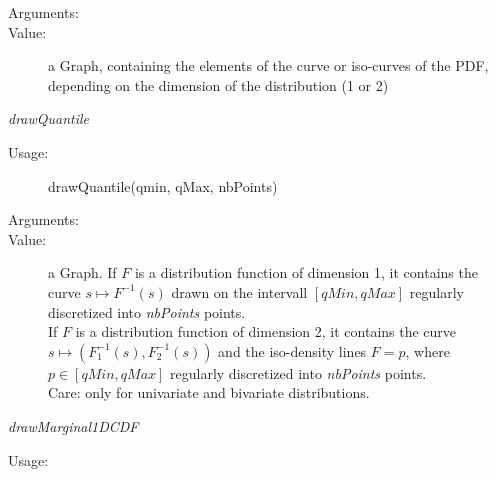 \begin{description}
\begin{description}
\begin{description}
\item[Arguments:] \rule{0pt}{1em}
\item[Value:] a Graph, containing the elements of the curve or iso-curves of the PDF, depending on the dimension of the distribution (1 or 2)
\end{description}
\bigskip



\item \textit{drawQuantile}
\begin{description}
\item[Usage:] drawQuantile(qmin, qMax, nbPoints)
\item[Arguments:] \rule{0pt}{1em}
\item[Value:] a Graph.
If $F$ is a distribution function of dimension 1, it contains the curve   $s \mapsto F^{-1}(s)$ drawn on the intervall $[qMin, qMax]$ regularly discretized into \textit{nbPoints} points. \\
If $F$ is a distribution function of dimension 2, it contains the curve $s \mapsto (F_1^{-1}(s), F_2^{-1}(s))$  and the iso-density lines $F=p$, where $p\in  [qMin, qMax]$ regularly discretized into \textit{nbPoints} points. \\
Care: only for univariate and bivariate distributions.
\end{description}
\bigskip

\item \textit{drawMarginal1DCDF}
\begin{description}
\item[Usage:] \rule{0pt}{1em}


\end{description}
\end{description}
\end{description}
